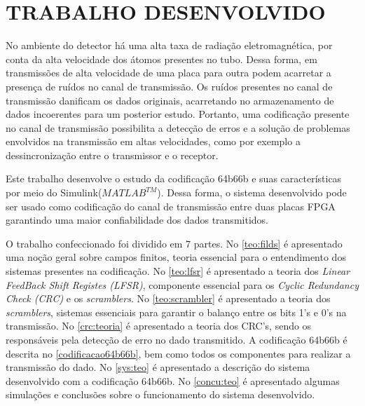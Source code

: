 \section{TRABALHO DESENVOLVIDO}

No ambiente do detector há uma alta taxa de radiação eletromagnética, por conta da alta velocidade dos átomos presentes no tubo. Dessa forma, em transmissões de alta velocidade de uma placa para outra podem acarretar a presença de ruídos no canal de transmissão. Os ruídos presentes no canal de transmissão danificam os dados originais, acarretando no armazenamento de dados incoerentes para um posterior estudo. Portanto, uma codificação presente no canal de transmissão possibilita a detecção de erros e a solução de problemas envolvidos na transmissão em altas velocidades, como por exemplo a dessincronização entre o transmissor e o receptor.

Este trabalho desenvolve o estudo da codificação 64b66b e suas características por meio do Simulink($MATLAB^{TM}$). Dessa forma, o sistema desenvolvido pode ser usado como codificação do canal de transmissão entre duas placas FPGA garantindo uma maior confiabilidade dos dados transmitidos.

O trabalho confeccionado foi dividido em 7 partes. No \autoref{teo:filds} é apresentado uma noção geral sobre campos finitos, teoria essencial para o entendimento dos sistemas presentes na codificação. No \autoref{teo:lfsr} é apresentado a teoria dos \textit{Linear FeedBack Shift Registes (LFSR)}, componente essencial para os \textit{Cyclic Redundancy Check (CRC)} e os \textit{scramblers}. No \autoref{teo:scrambler} é apresentado a teoria dos \textit{scramblers}, sistemas essenciais para garantir o balanço entre os bits 1's e 0's na transmissão. No \autoref{crc:teoria} é apresentado a teoria dos CRC's, sendo os responsáveis pela detecção de erro no dado transmitido. A codificação 64b66b é descrita no \autoref{codificacao64b66b}, bem como todos os componentes para realizar a transmissão do dado. No \autoref{sys:teo} é apresentado a descrição do sistema desenvolvido com a codificação 64b66b. No \autoref{concu:teo} é apresentado algumas simulações e conclusões sobre o funcionamento do sistema desenvolvido.
